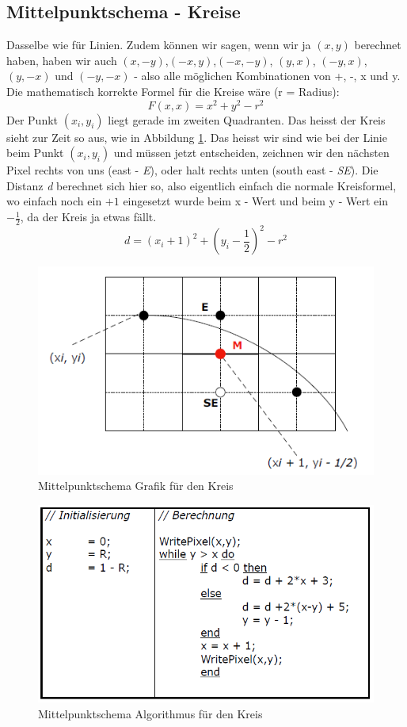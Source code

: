 \subsection{Mittelpunktschema - Kreise}
Dasselbe wie für Linien. Zudem können wir sagen, wenn wir ja \((x,y)\) berechnet haben, haben wir auch \((x,-y)\),\((-x,y)\),\((-x,-y)\), \((y,x)\), \((-y,x)\), \((y,-x)\) und \((-y,-x)\) - also alle möglichen Kombinationen von +, -, x und y. Die mathematisch korrekte Formel für die Kreise wäre (r = Radius):
\begin{displaymath}
F(x,x) = x^2 + y^2 - r^2
\end{displaymath}
Der Punkt \((x_i,y_i)\) liegt gerade im zweiten Quadranten. Das heisst der Kreis sieht zur Zeit so aus, wie in Abbildung \ref{fig:mittelpunktschema_kreis}. Das heisst wir sind wie bei der Linie beim Punkt \((x_i,y_i)\) und müssen jetzt entscheiden, zeichnen wir den nächsten Pixel rechts von uns (east - \textit{E}), oder halt rechts unten (south east - \textit{SE}). Die Distanz \textit{d} berechnet sich hier so, also eigentlich einfach die normale Kreisformel, wo einfach noch ein \(+1\) eingesetzt wurde beim x - Wert und beim y - Wert ein \(- \frac{1}{2}\), da der Kreis ja etwas fällt.
\begin{displaymath}
d = (x_i + 1)^2 + (y_i - \frac{1}{2})^2 - r^2
\end{displaymath}
\begin{figure}[!ht]
	\centering
	\includegraphics[width=0.4\linewidth]{fig/mittelpunktschema_kreis}
	\caption{Mittelpunktschema Grafik für den Kreis}
	\label{fig:mittelpunktschema_kreis}
\end{figure}

\begin{figure}[!ht]
	\centering
	\includegraphics[width=0.4\linewidth]{fig/mittelpunktschema_algo_kreis}
	\caption{Mittelpunktschema Algorithmus für den Kreis}
	\label{mittelpunktschema_algo_kreis}
\end{figure}
